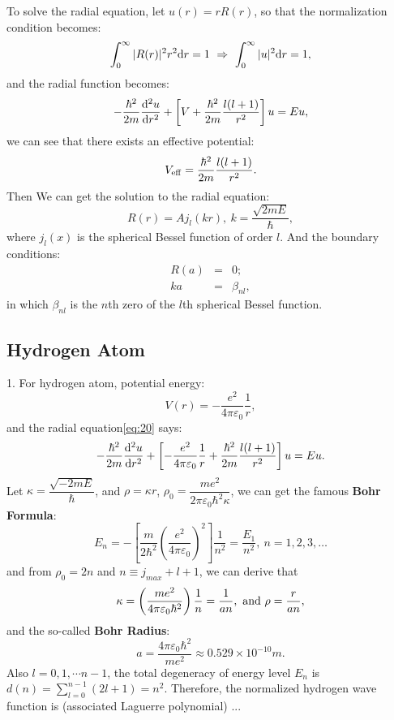 \documentclass[12pt, 
]{article}
\begin{document}
\noindent To solve the radial equation, let $u(r)=rR(r)$, so that the normalization condition becomes:
\[
	\int_0^\infty|R(r)|^2 r^2{\rm d}r=1~\Rightarrow~\int_0^\infty|u|^2{\rm d}r=1
,\]
and the radial function becomes:
\begin{equation}\label{eq:20}
	-\frac{\hbar^2}{2m}\frac{{\rm d}^2u}{{\rm d}r^2}+\left[V+\frac{\hbar^2}{2m}\frac{l(l+1)}{r^2}\right]u=Eu,
\end{equation}
we can see that there exists an effective potential:
\[
	V_{\rm eff}=\frac{\hbar^2}{2m}\frac{l(l+1)}{r^2}.
\]
Then We can get the solution to the radial equation:
\[
	R(r)=Aj_l(kr),~k=\frac{\sqrt{2mE}}{\hbar},
\]
where $j_l(x)$ is the spherical Bessel function of order $l$. And the boundary conditions:
\begin{eqnarray*}
	R(a)&=&0;\\
	ka&=&\beta_{nl},
\end{eqnarray*}
in which $\beta_{nl}$ is the $n$th zero of the $l$th spherical Bessel function.

\subsection{Hydrogen Atom}
1. For hydrogen atom, potential energy:
\[
	V(r)=-\frac{e^2}{4\pi\varepsilon_0}\frac{1}{r},
\]
and the radial equation\eqref{eq:20} says:
\[
	-\frac{\hbar^2}{2m}\frac{{\rm d}^2 u}{{\rm d}r^2}+\left[-\frac{e^2}{4\pi\varepsilon_0}\frac{1}{r}+\frac{\hbar^2}{2m}\frac{l(l+1)}{r^2}\right]u=Eu.
\]
Let $\kappa=\dfrac{\sqrt{-2mE}}{\hbar}$, and $\rho=\kappa r$, $\rho_0=\dfrac{me^2}{2\pi\varepsilon_0\hbar^2\kappa}$, we can get the famous {\bf Bohr Formula}:
\begin{equation}
	E_n=-\left[\frac{m}{2\hbar^2}\left(\frac{e^2}{4\pi\varepsilon_0}\right)^2\right]\frac{1}{n^2}=\frac{E_1}{n^2},~n=1,2,3,\dots
\end{equation}
and from $\rho_0=2n$ and $n\equiv j_{max}+l+1$, we can derive that
\[
	\kappa=\left(\frac{me^2}{4\pi\varepsilon_0\hbar^2}\right)\frac{1}{n}=\frac{1}{an}, ~{\rm and}~\rho=\frac{r}{an},
\]
and the so-called {\bf Bohr Radius}:
\[
	a=\frac{4\pi\varepsilon_0\hbar^2}{me^2}\approx 0.529\times10^{-10}m.
\]
Also $l=0,1,\cdots n-1$, the total degeneracy of energy level $E_n$ is $\displaystyle d(n)=\sum_{l=0}^{n-1}(2l+1)=n^2$. Therefore, the normalized hydrogen wave function is (associated Laguerre polynomial) ...
~\\
\end{document}
